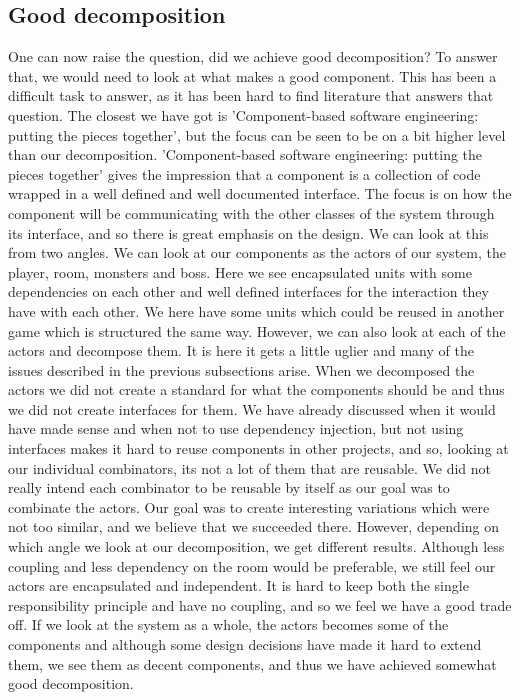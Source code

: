 \subsection{Good decomposition}
One can now raise the question, did we achieve good decomposition? To answer that, we would need to look at what makes a good component. This has been a difficult task to answer, as it has been hard to find literature that answers that question. The closest we have got is 'Component-based software engineering: putting the pieces together'\cite{Components}, but the focus can be seen to be on a bit higher level than our decomposition. 'Component-based software engineering: putting the pieces together' gives the impression that a component is a collection of code wrapped in a well defined and well documented interface. The focus is on how the component will be communicating with the other classes of the system through its interface, and so there is great emphasis on the design. We can look at this from two angles. We can look at our components as the actors of our system, the player, room, monsters and boss. Here we see encapsulated units with some dependencies on each other and well defined interfaces for the interaction they have with each other. We here have some units which could be reused in another game which is structured the same way. However, we can also look at each of the actors and decompose them. It is here it gets a little uglier and many of the issues described in the previous subsections arise. When we decomposed the actors we did not create a standard for what the components should be and thus we did not create interfaces for them. We have already discussed when it would have made sense and when not to use dependency injection, but not using interfaces makes it hard to reuse components in other projects, and so, looking at our individual combinators, its not a lot of them that are reusable. We did not really intend each combinator to be reusable by itself as our goal was to combinate the actors. Our goal was to create interesting variations which were not too similar, and we believe that we succeeded there. However, depending on which angle we look at our decomposition, we get different results. Although less coupling and less dependency on the room would be preferable, we still feel our actors are encapsulated and independent. It is hard to keep both the single responsibility principle and have no coupling, and so we feel we have a good trade off. If we look at the system as a whole, the actors becomes some of the components and although some design decisions have made it hard to extend them, we see them as decent components, and thus we have achieved somewhat good decomposition.\\
